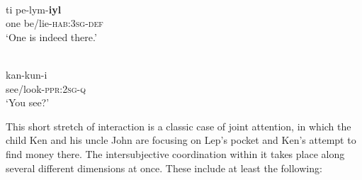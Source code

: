 \documentclass[output=paper]{langsci/langscibook}
\begin{document}
	\ex \label{ex:rumsey:ar28e}
	\\
	\gll ti pe-lym-\textbf{iyl}\\
	one be/lie-\textsc{hab}:3\textsc{sg}-\textsc{def}\\
	\glt ‘One is indeed there.’	
	
	\ex \label{ex:rumsey:ar28f}
	\\ 
	\gll kan-kun-i\\
	see/look-\textsc{ppr}:2\textsc{sg}-\textsc{q}\\
	\glt ‘You see?’
\z \z

This short stretch of interaction is a classic case of joint attention, in which the child Ken and his uncle John are focusing on Lep’s pocket and Ken’s attempt to find money there.  The intersubjective coordination within it takes place along several different dimensions at once. These include at least the following:
\end{document}
